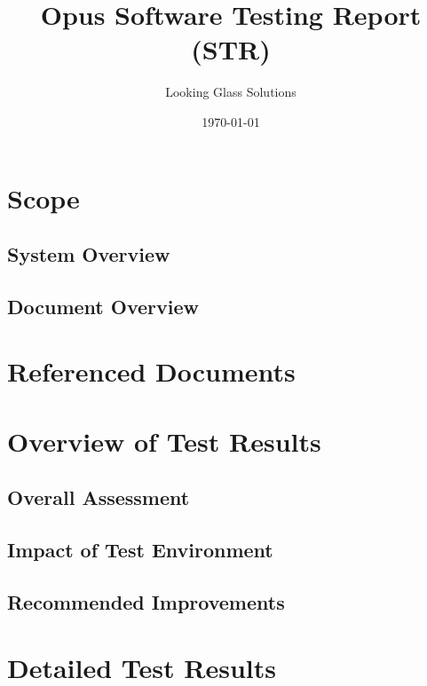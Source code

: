 \documentclass[a4, 11pt]{article}
\title{Opus Software Testing Report (STR)}
\author{Looking Glass Solutions}
\date{\today}
\begin{document}
\maketitle
\tableofcontents
\newpage

\section{Scope}
\subsection{System Overview}
\subsection{Document Overview}

\section{Referenced Documents}

\section{Overview of Test Results}
\subsection{Overall Assessment}
\subsection{Impact of Test Environment}
\subsection{Recommended Improvements}

\section{Detailed Test Results}
\end{document}
